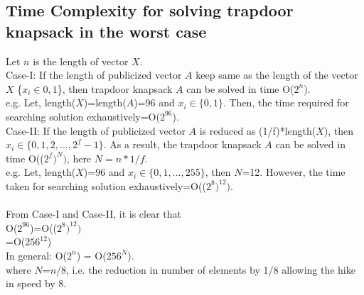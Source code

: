 \documentclass[5p,times,twocolumn]{elsarticle}
\begin{document}
\subsection{Time Complexity for solving trapdoor knapsack in the worst case}
Let $n$ is the length of vector $X$.\\

Case-I: If the length of publicized vector $A$ keep same as the length of the vector $X$ \{$x_{i} \in{0,1}$\}, then trapdoor knapsack $A$ can be solved in time O($2^{n}$).\\
e.g. Let, length($X$)=length($A$)=96 and $x_{i} \in \{0,1\}$. Then, the time required for searching solution exhaustively=O($2^{96}$).\\  

Case-II: If the length of publicized vector $A$ is reduced as (1/f)*length($X$), then $x_{i} \in \{0,1,2,..., 2^{f}-1\}$. As a result, the trapdoor knapsack $A$ can be solved in time O(($2^{f})^{N})$, here $N=n*1/f$.\\
e.g. Let, length($X$)=96 and $x_{i} \in \{0, 1,..., 255\}$, then $N$=12. However, the time taken for searching solution exhaustively=O(($2^{8})^{12})$.\\\\   
From Case-I and Case-II, it is clear that\\ 
\indent O($2^{96}$)=O(($2^{8})^{12})$\\
\indent\hspace{10 mm}=O($256^{12}$)\\
In general:
O($2^{n}$) = O($256^{N}$).\\ where $N$=$n$/8,  i.e. the reduction in number of elements by 1/8 allowing the hike in speed by 8.
\end{document}
